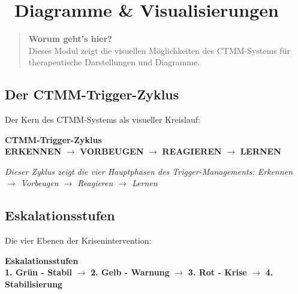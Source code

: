 
\section*{\texorpdfstring{\textcolor{ctmmBlue}{\faPalette~Diagramme \& Visualisierungen}}{Diagramme \& Visualisierungen}}

\begin{quote}
\textbf{\textcolor{ctmmBlue}{Worum geht's hier?}}\\
Dieses Modul zeigt die visuellen Möglichkeiten des CTMM-Systems für therapeutische Darstellungen und Diagramme.
\end{quote}

\subsection*{\texorpdfstring{\textcolor{ctmmBlue}{Der CTMM-Trigger-Zyklus}}{Der CTMM-Trigger-Zyklus}}

Der Kern des CTMM-Systems als visueller Kreislauf:

\begin{center}
\begin{tcolorbox}[colback=ctmmBlue!10!white,colframe=ctmmBlue,width=10cm]
\centering
\textbf{CTMM-Trigger-Zyklus}\\[0.5cm]
\textcolor{ctmmBlue}{\textbf{ERKENNEN}} $\rightarrow$ \textcolor{ctmmGreen}{\textbf{VORBEUGEN}} $\rightarrow$ \textcolor{ctmmOrange}{\textbf{REAGIEREN}} $\rightarrow$ \textcolor{ctmmPurple}{\textbf{LERNEN}}
\end{tcolorbox}
\end{center}

\textit{Dieser Zyklus zeigt die vier Hauptphasen des Trigger-Managements: Erkennen $\rightarrow$ Vorbeugen $\rightarrow$ Reagieren $\rightarrow$ Lernen}

\subsection*{\textcolor{ctmmOrange}{Eskalationsstufen}}

Die vier Ebenen der Krisenintervention:

\begin{center}
\begin{tcolorbox}[colback=ctmmOrange!10!white,colframe=ctmmOrange,width=12cm]
\centering
\textbf{Eskalationsstufen}\\[0.5cm]
\textcolor{ctmmGreen}{\textbf{1. Grün - Stabil}} $\rightarrow$ \textcolor{ctmmOrange}{\textbf{2. Gelb - Warnung}} $\rightarrow$ \textcolor{ctmmRed}{\textbf{3. Rot - Krise}} $\rightarrow$ \textcolor{ctmmPurple}{\textbf{4. Stabilisierung}}
\end{tcolorbox}
\end{center}

